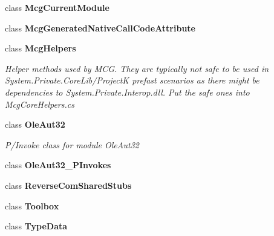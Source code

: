 \begin{DoxyCompactItemize}
class {\bfseries Mcg\+Current\+Module}
\item 
class {\bfseries Mcg\+Generated\+Native\+Call\+Code\+Attribute}
\item 
class {\bfseries Mcg\+Helpers}
\begin{DoxyCompactList}\small\item\em Helper methods used by M\+CG. They are typically not safe to be used in System.\+Private.\+Core\+Lib/\+ProjectK prefast scenarios as there might be dependencies to System.\+Private.\+Interop.\+dll. Put the safe ones into Mcg\+Core\+Helpers.\+cs \end{DoxyCompactList}\item 
class {\bfseries Ole\+Aut32}
\begin{DoxyCompactList}\small\item\em P/\+Invoke class for module \textquotesingle{}Ole\+Aut32\textquotesingle{} \end{DoxyCompactList}\item 
class {\bfseries Ole\+Aut32\+\_\+\+P\+Invokes}
\item 
class {\bfseries Reverse\+Com\+Shared\+Stubs}
\item 
class {\bfseries Toolbox}
\item 
class {\bfseries Type\+Data}
\end{DoxyCompactItemize}
